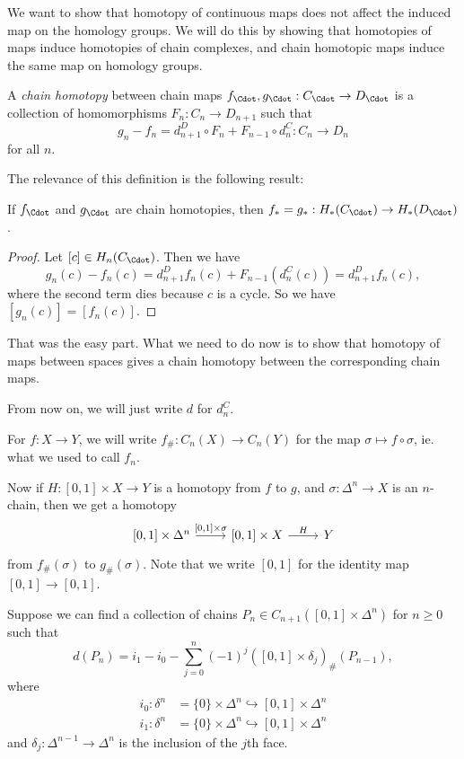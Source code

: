 \documentclass[a4paper]{article}
\begin{document}
We want to show that homotopy of continuous maps does not affect the induced map on the homology groups. We will do this by showing that homotopies of maps induce homotopies of chain complexes, and chain homotopic maps induce the same map on homology groups.

\begin{defi}
  A \emph{chain homotopy} between chain maps $f_{\Cdot}, g_{\Cdot}: C_{\Cdot} \to D_{\Cdot}$ is a collection of homomorphisms $F_n: C_n \to D_{n + 1}$ such that
  \[
    g_n - f_n = d_{n + 1}^D \circ F_n + F_{n - 1} \circ d_n^C: C_n \to D_n
  \]
  for all $n$.
\end{defi}

The relevance of this definition is the following result:
\begin{lemma}
  If $f_{\Cdot}$ and $g_{\Cdot}$ are chain homotopies, then $f_* = g_*: H_*(C_{\Cdot}) \to H_*(D_{\Cdot})$.
\end{lemma}

\begin{proof}
  Let $[c] \in H_n(C_{\Cdot})$. Then we have
  \[
    g_n(c) - f_n(c) = d_{n + 1}^Df_n(c) + F_{n - 1}(d_n^C(c)) = d_{n + 1}^Df_n(c),
  \]
  where the second term dies because $c$ is a cycle. So we have $[g_n(c)] = [f_n(c)]$.
\end{proof}

That was the easy part. What we need to do now is to show that homotopy of maps between spaces gives a chain homotopy between the corresponding chain maps.

\begin{notation}
  From now on, we will just write $d$ for $d_n^C$.

  For $f: X \to Y$, we will write $f_\#: C_n(X) \to C_n(Y)$ for the map $\sigma \mapsto f \circ \sigma$, ie. what we used to call $f_n$.
\end{notation}

Now if $H: [0, 1] \times X \to Y$ is a homotopy from $f$ to $g$, and $\sigma: \Delta^n \to X$ is an $n$-chain, then we get a homotopy
\[
  \begin{tikzcd}
    \lbrack0, 1\rbrack \times \Delta^n \ar[r, "{[0, 1] \times \sigma}"] & \lbrack0, 1\rbrack \times X \ar[r, "H"] & Y
  \end{tikzcd}
\]
from $f_\#(\sigma)$ to $g_\#(\sigma)$. Note that we write $[0, 1]$ for the identity map $[0, 1] \to [0, 1]$.


Suppose we can find a collection of chains $P_n \in C_{n + 1}([0, 1] \times \Delta^n)$ for $n \geq 0$ such that
\[
  d(P_n) = i_1 - i_0 - \sum_{j = 0}^n (-1)^j ([0, 1] \times \delta_j)_\#(P_{n - 1}),
\]
where
\begin{align*}
  i_0: \delta^n &= \{0\} \times \Delta^n \hookrightarrow [0, 1] \times \Delta^n\\
  i_1: \delta^n &= \{0\} \times \Delta^n \hookrightarrow [0, 1] \times \Delta^n
\end{align*}
and $\delta_j: \Delta^{n - 1} \to \Delta^n$ is the inclusion of the $j$th face.
\end{document}
